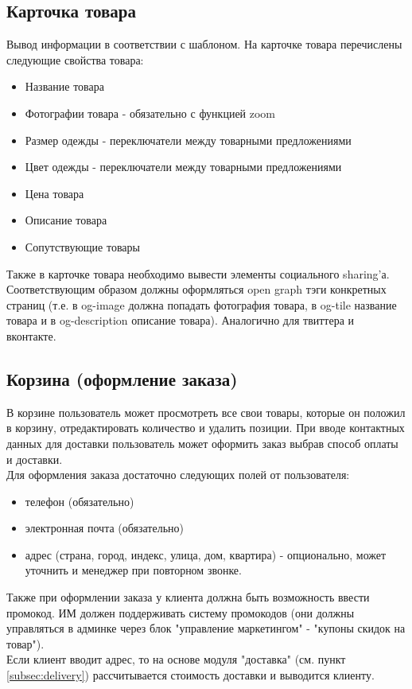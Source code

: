\documentclass[DIV=calc, paper=a4, fontsize=11pt]{scrartcl} %
\begin{document}
\subsection{Карточка товара}
Вывод информации в соответствии с шаблоном. На карточке товара перечислены следующие свойства товара:

\begin{itemize}
	\item Название товара
	\item Фотографии товара - обязательно с функцией zoom
	\item Размер одежды - переключатели между товарными предложениями
	\item Цвет одежды - переключатели между товарными предложениями
	\item Цена товара
	\item Описание товара
	\item Сопутствующие товары
\end{itemize}

Также в карточке товара необходимо вывести элементы социального sharing'а. Соответствующим образом должны оформляться open graph тэги конкретных страниц (т.е. в og-image должна попадать фотография товара, в og-tile название товара и в og-description описание товара). Аналогично для твиттера и вконтакте.

\subsection{Корзина (оформление заказа)}
В корзине пользователь может просмотреть все свои товары, которые он положил в корзину, отредактировать количество и удалить позиции. При вводе контактных данных для доставки пользователь может оформить заказ выбрав способ оплаты и доставки.
\\[0.5cm]
Для оформления заказа достаточно следующих полей от пользователя:
\begin{itemize}
	\item телефон (обязательно)
	\item электронная почта (обязательно)
	\item адрес (страна, город, индекс, улица, дом, квартира) - опционально, может уточнить и менеджер при повторном звонке.
\end{itemize}

Также при оформлении заказа у клиента должна быть возможность ввести промокод. ИМ должен поддерживать систему промокодов (они должны управляться в админке через блок "управление маркетингом" - "купоны скидок на товар").
\\[0.5cm]
Если клиент вводит адрес, то на основе модуля "доставка" (см. пункт \ref{subsec:delivery}) рассчитывается стоимость доставки и выводится клиенту.
\end{document}
